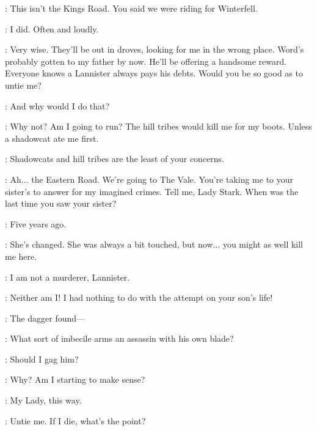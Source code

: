 \TYRION: This isn't the Kings Road. You said we were riding for Winterfell. 

\CATELYN: I did.  Often and loudly. 

\TYRION: Very wise. They'll be out in droves, looking for me in the wrong place. Word's probably gotten to my father by now. He'll be offering a handsome reward. Everyone knows a Lannister always pays his debts. Would you be so good as to untie me? 

\CATELYN: And why would I do that? 

\TYRION: Why not? Am I going to run? The hill tribes would kill me for my boots. Unless a shadowcat ate me first. 

\CATELYN: Shadowcats and hill tribes are the least of your concerns. 

\TYRION: Ah$\ldots$ the Eastern Road. We're going to The Vale. You're taking me to your sister's to answer for my imagined crimes. Tell me, Lady Stark. When was the last time you saw your sister? 

\CATELYN: Five years ago. 

\TYRION: She's changed. She was always a bit touched, but now$\ldots$ you might as well kill me here. 

\CATELYN: I am not a murderer, Lannister. 

\TYRION: Neither am I! I had nothing to do with the attempt on your son's life! 

\CATELYN: The dagger found---

\TYRION: What sort of imbecile arms an assassin with his own blade? 

\RODRIK: Should I gag him? 

\TYRION: Why? Am I starting to make sense? 


\RODRIK: My Lady, this way. 


\TYRION: Untie me. If I die, what's the point? 


